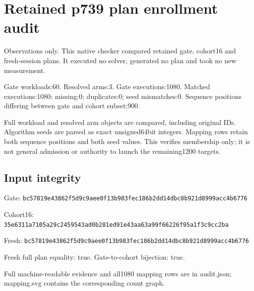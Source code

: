 \documentclass{article}
\begin{document}
\section*{Retained p739 plan enrollment audit}
Observations only. This native checker compared retained gate, cohort16 and fresh-session plans. It executed no solver, generated no plan and took no new measurement.\par
Gate workloads:60. Resolved arms:3. Gate executions:1080. Matched executions:1080; missing:0; duplicates:0; seed mismatches:0. Sequence positions differing between gate and cohort subset:900.\par
{}\par
Full workload and resolved arm objects are compared, including original IDs. Algorithm seeds are parsed as exact unsigned64bit integers. Mapping rows retain both sequence positions and both seed values. This verifies membership only; it is not general admission or authority to launch the remaining1200 targets.\par
\subsection*{Input integrity}
Gate: \texttt{\small bc57819e43862f5d9c9aee0f13b983fec186b2dd14dbc8b921d8999acc4b6776}\par
Cohort16: \texttt{\small 35e6311a7105a29c2459543ad0b281ed91e43aa63a99f66226f95a1f3c9cc2ba}\par
Fresh: \texttt{\small bc57819e43862f5d9c9aee0f13b983fec186b2dd14dbc8b921d8999acc4b6776}\par
\par Fresh full plan equality: true. Gate-to-cohort bijection: true.\par
Full machine-readable evidence and all1080 mapping rows are in audit.json; mapping.svg contains the corresponding count graph.
\end{document}
